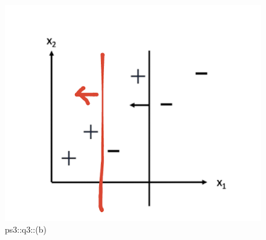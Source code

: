 \begin{answer}
\begin{figure}[H]
    \centering
    \includegraphics[width=0.5\linewidth]{Screenshot 2024-02-19 at 20.33.32.png}
    \caption{ps3::q3::(b)}
    \label{fig:enter-label}
\end{figure}
\end{answer}